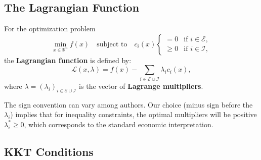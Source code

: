 \subsection{The Lagrangian Function}

\begin{definition}
    For the optimization problem
    \begin{equation}
        \min_{x \in \mathbb{R}^n} f(x) \quad \text{subject to} \quad c_i(x) \begin{cases} = 0 & \text{if } i \in \mathcal{E}, \\ \geq 0 & \text{if } i \in \mathcal{I}, \end{cases}
    \end{equation}
    the \textbf{Lagrangian function} is defined by:
    \begin{equation}
        \mathcal{L}(x, \lambda) = f(x) - \sum_{i \in \mathcal{E} \cup \mathcal{I}} \lambda_i c_i(x),
    \end{equation}
    where $\lambda = (\lambda_i)_{i \in \mathcal{E} \cup \mathcal{I}}$ is the vector of \textbf{Lagrange multipliers}.
\end{definition}

\begin{remarque}
    The sign convention can vary among authors. Our choice (minus sign before the $\lambda_i$) implies that for inequality constraints, the optimal multipliers will be positive $\lambda_i^* \geq 0$, which corresponds to the standard economic interpretation.
\end{remarque}

\subsection{KKT Conditions}

